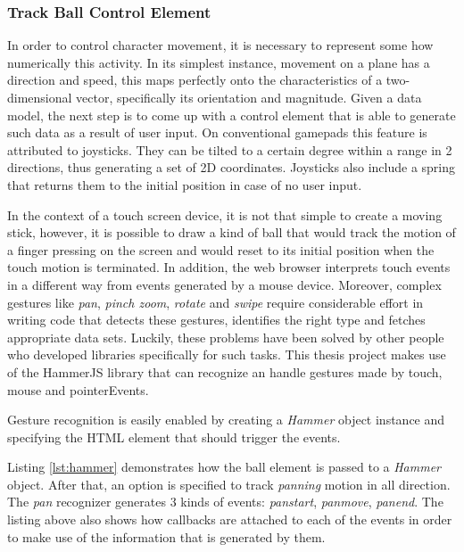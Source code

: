 
\subsubsection{Track Ball Control Element}

In order to control character movement, it is necessary to represent some how
numerically this activity. In its simplest instance, movement on a plane has a
direction and speed, this maps perfectly onto the characteristics of a two-
dimensional vector, specifically its orientation and magnitude. Given a data
model, the next step is to come up with a control element that is able to
generate such data as a result of user input. On conventional gamepads this
feature is attributed to joysticks. They can be tilted to a certain degree
within a range in 2 directions, thus generating a set of 2D coordinates.
Joysticks also include a spring that returns them to the initial position in
case of no user input.

In the context of a touch screen device, it is not that simple to create a
moving stick, however, it is possible to draw a kind of ball that would track
the motion of a finger pressing on the screen and would reset to its initial
position when the touch motion is terminated. In addition, the web browser
interprets touch events in a different way from events generated by a mouse
device. Moreover, complex gestures like \emph{pan}, \emph{pinch zoom},
\emph{rotate} and \emph{swipe} require considerable effort in writing code that
detects these gestures, identifies the right type and fetches appropriate data
sets. Luckily, these problems have been solved by other people who developed
libraries specifically for such tasks. This thesis project makes use of the
HammerJS\cite{hammer} library that can recognize an handle gestures made by
touch, mouse and pointerEvents.

Gesture recognition is easily enabled by creating a \emph{Hammer} object
instance and specifying the HTML element that should trigger the events.



Listing \ref{lst:hammer} demonstrates how the ball element is passed to a
\emph{Hammer} object. After that, an option is specified to track \emph{panning}
motion in all direction. The \emph{pan} recognizer generates 3 kinds of events:
\emph{panstart}, \emph{panmove}, \emph{panend}. The listing above also shows how
callbacks are attached to each of the events in order to make use of the
information that is generated by them.


